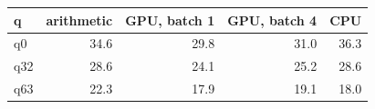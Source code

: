 \begin{tabular}{lrrrr}
\toprule
q & arithmetic & GPU, batch 1 & GPU, batch 4 & CPU \\
\midrule
q0 & 34.6 & 29.8 & 31.0 & 36.3 \\
q32 & 28.6 & 24.1 & 25.2 & 28.6 \\
q63 & 22.3 & 17.9 & 19.1 & 18.0 \\
\bottomrule
\end{tabular}
